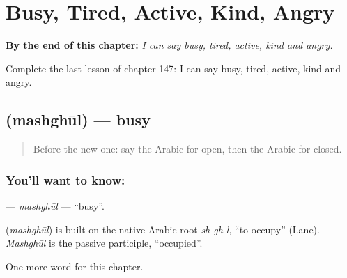 
\chapter{Busy, Tired, Active, Kind, Angry}
\label{ch:ar-busy-tired-active-kind-angry}

\begin{chapteropening}
\textbf{By the end of this chapter:} \emph{I can say busy, tired, active, kind and angry.}

Complete the last lesson of chapter 147: I can say busy, tired, active, kind and angry.
\end{chapteropening}

\section[\texorpdfstring{\ar{مشغول} (mashghūl)}{مشغول (mashghūl)}]{ (mashghūl) — busy}

\label{lesson:AR-C147-mashghul}



\begin{quote}
Before the new one: say the Arabic for open, then the Arabic for closed.
\end{quote}

\subsection*{You'll want to know: }
\textbf{} — \emph{mashghūl} — \textquotedblleft{}busy\textquotedblright{}.

\begin{cousinweb}
\textbf{} (\emph{mashghūl}) is built on the native Arabic root \emph{sh-gh-l}, \textquotedblleft{}to occupy\textquotedblright{} (Lane). \emph{Mashghūl} is the passive participle, \textquotedblleft{}occupied\textquotedblright{}.
\end{cousinweb}

\begin{grammarlens}[title={What you've built}]
One more word for this chapter.
\end{grammarlens}

